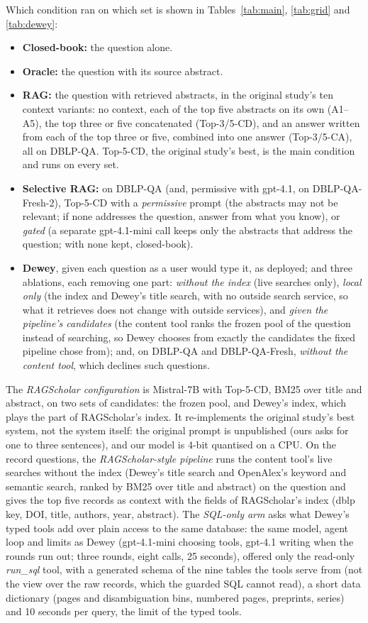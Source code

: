 \documentclass[conference]{IEEEtran}
\newcommand{\dq}{DBLP-QA}
\newcommand{\fresh}{DBLP-QA-Fresh}
\newcommand{\freshb}{DBLP-QA-Fresh-2}
\begin{document}
Which condition ran on which set is shown in Tables~\ref{tab:main}, \ref{tab:grid} and \ref{tab:dewey}:
\begin{itemize}
\item \textbf{Closed-book:} the question alone.
\item \textbf{Oracle:} the question with its source abstract.
\item \textbf{RAG:} the question with retrieved abstracts, in the original study's ten context variants:
  no context, each of the top five abstracts on its own (A1--A5), the top three or five concatenated
  (Top-3/5-CD), and an answer written from each of the top three or five, combined into one answer
  (Top-3/5-CA), all on \dq{}. Top-5-CD, the original study's best, is the main condition and runs on
  every set.
\item \textbf{Selective RAG:} on \dq{} (and, permissive with gpt-4.1, on \freshb{}), Top-5-CD with a \emph{permissive} prompt (the abstracts may not be
  relevant; if none addresses the question, answer from what you know), or \emph{gated} (a separate
  gpt-4.1-mini call keeps only the abstracts that address the question; with none kept, closed-book).
\item \textbf{Dewey}, given each question as a user would type it, as deployed; and three ablations, each
  removing one part: \emph{without the index} (live searches only), \emph{local only} (the index and
  Dewey's title search, with no outside search service, so what it retrieves does not change with outside
  services), and \emph{given the pipeline's candidates} (the content tool ranks the frozen pool of the
  question instead of searching, so Dewey chooses from exactly the candidates the fixed pipeline chose
  from); and, on \dq{} and \fresh{}, \emph{without the content tool}, which declines such questions.
\end{itemize}
The \emph{RAGScholar configuration} is Mistral-7B with Top-5-CD, BM25 over title and abstract, on two
sets of candidates: the frozen pool, and Dewey's index, which plays the part of RAGScholar's index. It re-implements the original study's best system, not the system itself: the original prompt is
unpublished (ours asks for one to three sentences), and our model is 4-bit quantised on a CPU. On the record questions, the \emph{RAGScholar-style pipeline} runs the content tool's live searches
without the index (Dewey's title search and OpenAlex's keyword and semantic search, ranked by BM25 over
title and abstract) on the question and gives the top five records as context with the fields of RAGScholar's index (dblp key,
DOI, title, authors, year, abstract). The \emph{SQL-only arm} asks what Dewey's typed tools add over plain
access to the same database: the same model, agent loop and limits as Dewey (gpt-4.1-mini choosing tools,
gpt-4.1 writing when the rounds run out; three rounds, eight calls, 25 seconds), offered only the
read-only \emph{run\_sql} tool, with a generated schema of the nine tables the tools serve from (not the
view over the raw records, which the guarded SQL cannot read), a short data dictionary (pages and
disambiguation bins, numbered pages, preprints, series) and 10 seconds per query, the limit of the typed
tools.
\end{document}

